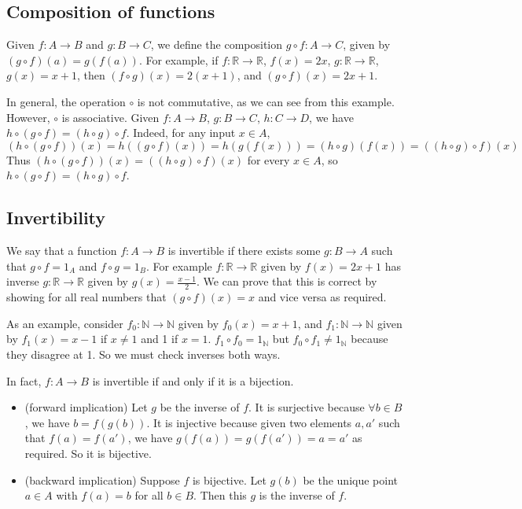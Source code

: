 \subsection{Composition of functions}
Given \(f\colon A \to B\) and \(g\colon B \to C\), we define the composition \(g\circ f \colon A \to C\), given by \((g\circ f)(a) = g(f(a))\).
For example, if \(f\colon \mathbb R \to \mathbb R\), \(f(x) = 2x\), \(g\colon \mathbb R \to \mathbb R\), \(g(x) = x+1\), then \((f \circ g)(x) = 2(x+1)\), and \((g \circ f)(x) = 2x + 1\).

In general, the operation \(\circ\) is not commutative, as we can see from this example.
However, \(\circ\) is associative.
Given \(f\colon A \to B\), \(g\colon B \to C\), \(h\colon C \to D\), we have \(h \circ (g \circ f) = (h \circ g) \circ f\).
Indeed, for any input \(x \in A\),
\[
	(h \circ (g \circ f))(x) = h((g \circ f)(x)) = h(g(f(x))) = (h \circ g)(f(x)) = ((h \circ g)\circ f)(x)
\]
Thus \((h \circ (g \circ f))(x) = ((h \circ g)\circ f)(x)\) for every \(x \in A\), so \(h \circ (g \circ f) = (h \circ g)\circ f\).

\subsection{Invertibility}
We say that a function \(f\colon A \to B\) is invertible if there exists some \(g\colon B \to A\) such that \(g \circ f = 1_A\) and \(f \circ g = 1_B\).
For example \(f\colon \mathbb R \to \mathbb R\) given by \(f(x)=2x+1\) has inverse \(g\colon \mathbb R \to \mathbb R\) given by \(g(x)=\frac{x-1}{2}\).
We can prove that this is correct by showing for all real numbers that \((g\circ f)(x) = x\) and vice versa as required.

As an example, consider \(f_0\colon \mathbb N \to \mathbb N\) given by \(f_0(x)=x+1\), and \(f_1\colon \mathbb N \to \mathbb N\) given by \(f_1(x) = x-1\) if \(x\neq 1\) and 1 if \(x=1\).
\(f_1\circ f_0 = 1_{\mathbb N}\) but \(f_0\circ f_1 \neq 1_{\mathbb N}\) because they disagree at 1.
So we must check inverses both ways.

In fact, \(f\colon A \to B\) is invertible if and only if it is a bijection.
\begin{itemize}
	\item (forward implication) Let \(g\) be the inverse of \(f\).
	      It is surjective because \(\forall b \in B\), we have \(b=f(g(b))\).
	      It is injective because given two elements \(a,a'\) such that \(f(a) = f(a')\), we have \(g(f(a)) = g(f(a')) = a = a'\) as required.
	      So it is bijective.
	\item (backward implication) Suppose \(f\) is bijective.
	      Let \(g(b)\) be the unique point \(a \in A\) with \(f(a) = b\) for all \(b \in B\).
	      Then this \(g\) is the inverse of \(f\).
\end{itemize}

